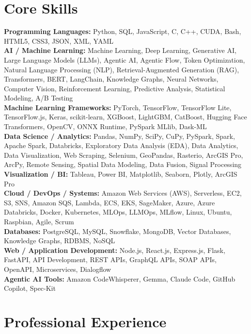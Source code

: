 \documentclass[10pt,letterpaper]{article}
\begin{document}
\section*{Core Skills}
\textbf{Programming Languages:} Python, SQL, JavaScript, C, C++, CUDA, Bash, HTML5, CSS3, JSON, XML, YAML \\
\textbf{AI / Machine Learning:} Machine Learning, Deep Learning, Generative AI, Large Language Models (LLMs), Agentic AI, Agentic Flow, Token Optimization, Natural Language Processing (NLP), Retrieval-Augmented Generation (RAG), Transformers, BERT, LangChain, Knowledge Graphs, Neural Networks, Computer Vision, Reinforcement Learning, Predictive Analysis, Statistical Modeling, A/B Testing \\
\textbf{Machine Learning Frameworks:} PyTorch, TensorFlow, TensorFlow Lite, TensorFlow.js, Keras, scikit-learn, XGBoost, LightGBM, CatBoost, Hugging Face Transformers, OpenCV, ONNX Runtime, PySpark MLlib, Dask-ML \\
\textbf{Data Science / Analytics:} Pandas, NumPy, SciPy, CuPy, PySpark, Spark, Apache Spark, Databricks, Exploratory Data Analysis (EDA), Data Analytics, Data Visualization, Web Scraping, Selenium, GeoPandas, Rasterio, ArcGIS Pro, ArcPy, Remote Sensing, Spatial Data Modeling, Data Fusion, Signal Processing \\
\textbf{Visualization / BI:} Tableau, Power BI, Matplotlib, Seaborn, Plotly, ArcGIS Pro \\
\textbf{Cloud / DevOps / Systems:} Amazon Web Services (AWS), Serverless, EC2, S3, SNS, Amazon SQS, Lambda, ECS, EKS, SageMaker, Azure, Azure Databricks, Docker, Kubernetes, MLOps, LLMOps, MLflow, Linux, Ubuntu, Raspbian, Agile, Scrum \\
\textbf{Databases:} PostgreSQL, MySQL, Snowflake, MongoDB, Vector Databases, Knowledge Graphs, RDBMS, NoSQL \\
\textbf{Web / Application Development:} Node.js, React.js, Express.js, Flask, FastAPI, API Development, REST APIs, GraphQL APIs, SOAP APIs, OpenAPI, Microservices, Dialogflow \\
\textbf{Agentic AI Tools:} Amazon CodeWhisperer, Gemma, Claude Code, GitHub Copilot, Spec-Kit

\section*{Professional Experience}
\end{document}
